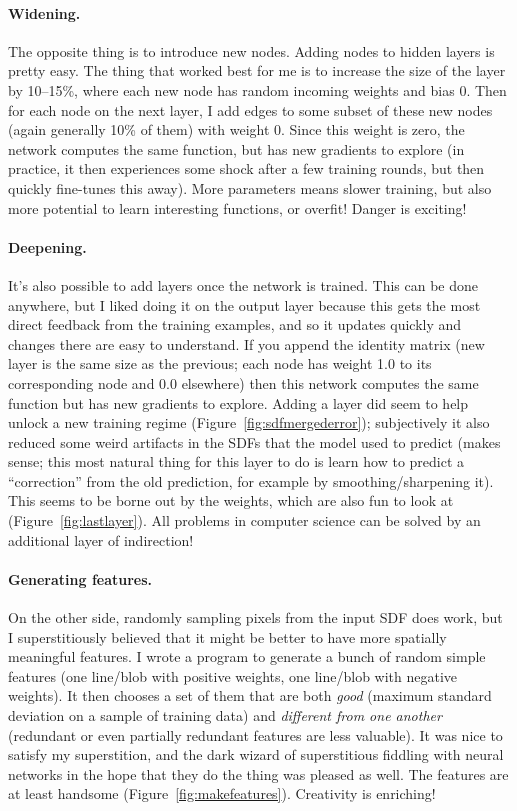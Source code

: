 \documentclass[twocolumn]{article}
\begin{document}
\paragraph{Widening.} The opposite thing is to introduce new nodes.
Adding nodes to hidden layers is pretty easy. The thing that worked
best for me is to increase the size of the layer by 10--15\%, where
each new node has random incoming weights and bias 0. Then for each
node on the next layer, I add edges to some subset of these new nodes
(again generally 10\% of them) with weight 0. Since this weight is
zero, the network computes the same function, but has new gradients
to explore (in practice, it then experiences some shock after a
few training rounds, but then quickly fine-tunes this away). More
parameters means slower training, but also more potential to learn
interesting functions, or overfit! Danger is exciting!

\paragraph{Deepening.} It's also possible to add layers once the
network is trained. This can be done anywhere, but I liked doing it on
the output layer because this gets the most direct feedback from the
training examples, and so it updates quickly and changes there are
easy to understand. If you append the identity matrix (new layer is
the same size as the previous; each node has weight 1.0 to its
corresponding node and 0.0 elsewhere) then this network computes
the same function but has new gradients to explore. Adding a layer
did seem to help unlock a new training regime
(Figure~\ref{fig:sdfmergederror}); subjectively it also reduced
some weird artifacts in the SDFs that the model used to predict (makes
sense; this most natural thing for this layer to do is learn how to
predict a ``correction'' from the old prediction, for example
by smoothing/sharpening it). This seems to be borne out by the
weights, which are also fun to look at (Figure~\ref{fig:lastlayer}).
All problems in computer science can be solved by an additional
layer of indirection!

\paragraph{Generating features.} On the other side, randomly sampling
pixels from the input SDF does work, but I superstitiously believed
that it might be better to have more spatially meaningful features. I
wrote a program to generate a bunch of random simple features (one
line/blob with positive weights, one line/blob with negative weights).
It then chooses a set of them that are both {\em good} (maximum
standard deviation on a sample of training data) and {\em different
  from one another} (redundant or even partially redundant features
are less valuable). It was nice to satisfy my superstition, and the
dark wizard of superstitious fiddling with neural networks in the
hope that they do the thing was pleased as well. The features are
at least handsome (Figure~\ref{fig:makefeatures}). Creativity is
enriching!
\end{document}
